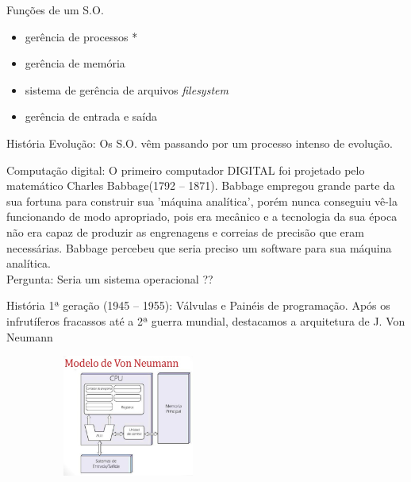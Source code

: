 \documentclass[11pt]{beamer}
\begin{document}
\begin{frame}{Funções de um S.O.}
  \begin{itemize}
  \item gerência de processos *
  \item gerência de memória
  \item sistema de gerência de arquivos \textit{filesystem}
  \item gerência de entrada e saída
  \end{itemize}
\end{frame}


\begin{frame}{História}
  Evolução: Os S.O. vêm passando por um processo intenso de evolução.
	
  \vspace{0.2in}
	
  Computação digital: O primeiro computador DIGITAL foi projetado pelo matemático Charles Babbage(1792 -- 1871).
  Babbage empregou grande parte da sua fortuna para construir sua 'máquina analítica', porém nunca conseguiu vê-la funcionando
  de modo apropriado, pois era mecânico e a tecnologia da sua época não era capaz de produzir as engrenagens e correias de precisão 
  que eram necessárias.
  Babbage percebeu que seria preciso um software para sua máquina analítica. \\
  Pergunta: Seria um sistema operacional ??
\end{frame}

\begin{frame}{História}
	1ª geração (1945 -- 1955): Válvulas e Painéis de programação.
	Após os infrutíferos fracassos até a 2ª guerra mundial, destacamos a arquitetura de J. Von Neumann

	\begin{figure}[h]
	\includegraphics[width=60mm, height=40mm]{Figuras/modelo-de-von-neumann.jpg}
	\end{figure}

\end{frame}
\end{document}

